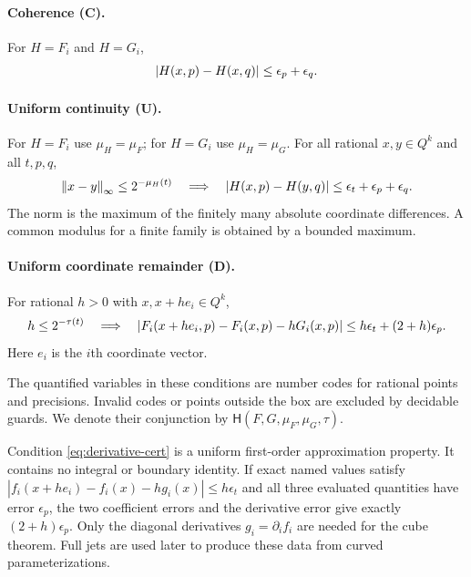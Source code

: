 \paragraph{Coherence (C).}
For $H=F_i$ and $H=G_i$,
\begin{equation}\label{eq:coherence}
 \left|H(x,p)-H(x,q)\right|\le\epsilon_p+\epsilon_q.
\end{equation}

\paragraph{Uniform continuity (U).}
For $H=F_i$ use $\mu_H=\mu_F$; for $H=G_i$ use $\mu_H=\mu_G$.
For all rational $x,y\in Q^k$ and all $t,p,q$,
\begin{equation}\label{eq:uc}
 \left\|x-y\right\|_\infty\le2^{-\mu_H(t)}
 \quad\Longrightarrow\quad
 \left|H(x,p)-H(y,q)\right|
 \le\epsilon_t+\epsilon_p+\epsilon_q.
\end{equation}
The norm is the maximum of the finitely many absolute coordinate
differences. A common modulus for a finite family is obtained by a bounded
maximum.

\paragraph{Uniform coordinate remainder (D).}
For rational $h>0$ with $x,x+he_i\in Q^k$,
\begin{equation}\label{eq:derivative-cert}
 h\le2^{-\tau(t)}
 \quad\Longrightarrow\quad
 \left|F_i(x+he_i,p)-F_i(x,p)-hG_i(x,p)\right|
 \le h\epsilon_t+(2+h)\epsilon_p.
\end{equation}
Here $e_i$ is the $i$th coordinate vector.

The quantified variables in these conditions are number codes for rational
points and precisions. Invalid codes or points outside the box are excluded
by decidable guards. We denote their conjunction by
$\mathsf H(F,G,\mu_F,\mu_G,\tau)$.

\begin{remark}
Condition \eqref{eq:derivative-cert} is a uniform first-order approximation
property. It contains no integral or boundary identity. If exact named
values satisfy
$|f_i(x+he_i)-f_i(x)-hg_i(x)|\le h\epsilon_t$ and all three evaluated
quantities have error $\epsilon_p$, the two coefficient errors and the
derivative error give exactly $(2+h)\epsilon_p$.
Only the diagonal derivatives $g_i=\partial_i f_i$ are needed for the cube
theorem. Full jets are used later to produce these data from curved
parameterizations.
\end{remark}

